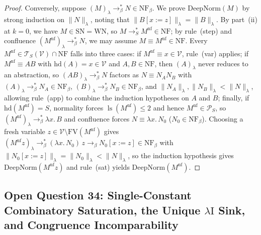\documentclass[11pt,reqno]{amsart}
\numberwithin{equation}{section}
\theoremstyle{plain}
\theoremstyle{definition}
\theoremstyle{remark}
\DeclareMathOperator{\ls}{ls}
\newcommand{\TSV}{\mathcal{T}_S(\mathcal{V})}
\newcommand{\NF}{\mathrm{NF}}
\newcommand{\SN}{\mathrm{SN}}
\newcommand{\WN}{\mathrm{WN}}
\newcommand{\redSs}{\to_S^*}
\begin{document}
\begin{proof}
Conversely, suppose $(M)_\lambda \to_\beta^* N \in \NF_\beta$. We prove $\mathrm{DeepNorm}(M)$ by strong induction on $\|N\|_\lambda$, noting that $\|B[x := z]\|_\lambda = \|B\|_\lambda$. By part~(ii) at $k = 0$, we have $M \in \SN = \WN$, so $M \redSs M^{\mathrm{nf}} \in \NF$; by rule~(step) and confluence $(M^{\mathrm{nf}})_\lambda \to_\beta^* N$, we may assume $M \equiv M^{\mathrm{nf}} \in \NF$. Every $M^{\mathrm{nf}} \in \TSV \cap \NF$ falls into three cases: if $M^{\mathrm{nf}} \equiv x \in \mathcal{V}$, rule~(var) applies; if $M^{\mathrm{nf}} \equiv A B$ with $\mathrm{hd}(A) = x \in \mathcal{V}$ and $A, B \in \NF$, then $(A)_\lambda$ never reduces to an abstraction, so $(A B)_\lambda \to_\beta^* N$ factors as $N \equiv N_A N_B$ with $(A)_\lambda \to_\beta^* N_A \in \NF_\beta$, $(B)_\lambda \to_\beta^* N_B \in \NF_\beta$, and $\|N_A\|_\lambda, \|N_B\|_\lambda < \|N\|_\lambda$, allowing rule~(app) to combine the induction hypotheses on $A$ and $B$; finally, if $\mathrm{hd}(M^{\mathrm{nf}}) = S$, normality forces $\ls(M^{\mathrm{nf}}) \le 2$ and hence $M^{\mathrm{nf}} \in \mathcal{P}_S$, so $(M^{\mathrm{nf}})_\lambda \to_\beta^* \lambda x.\, B$ and confluence forces $N \equiv \lambda x.\, N_0$ ($N_0 \in \NF_\beta$). Choosing a fresh variable $z \in \mathcal{V} \setminus \mathrm{FV}(M^{\mathrm{nf}})$ gives $(M^{\mathrm{nf}} z)_\lambda \to_\beta^* (\lambda x.\, N_0)\,z \to_\beta N_0[x := z] \in \NF_\beta$ with $\|N_0[x := z]\|_\lambda = \|N_0\|_\lambda < \|N\|_\lambda$, so the induction hypothesis gives $\mathrm{DeepNorm}(M^{\mathrm{nf}} z)$ and rule~(sat) yields $\mathrm{DeepNorm}(M^{\mathrm{nf}})$.
\end{proof}

\subsection{Open Question 34: Single-Constant Combinatory Saturation, the Unique \texorpdfstring{$\lambda\mathrm{I}$}{lambda-I} Sink, and Congruence Incomparability}\label{subsec:question-34}
\end{document}
